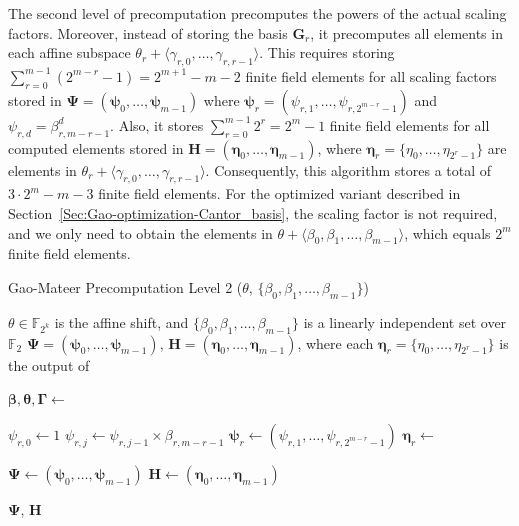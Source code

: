 The second level of precomputation precomputes the powers of the actual scaling factors. Moreover, instead of storing the basis $\mathbf{G}_r$, it precomputes all elements in each affine subspace $\theta_r + \langle \gamma_{r,0}, \ldots, \gamma_{r,r-1} \rangle$. This requires storing $\sum_{r=0}^{m-1} (2^{m-r} - 1) = 2^{m+1} - m - 2$ finite field elements for all scaling factors stored in $\boldsymbol{\Psi} = (\boldsymbol{\psi}_0, \ldots, \boldsymbol{\psi}_{m-1})$ where $\boldsymbol{\psi}_r = (\psi_{r,1}, \ldots,   \psi_{r,2^{m-r}-1})$ and $\psi_{r,d} = \beta_{r, m-r-1}^d$. 
Also, it stores $\sum_{r=0}^{m-1} 2^r = 2^m - 1$ finite field elements for all computed elements stored in $\mathbf{H} = (\boldsymbol{\eta}_0, \ldots, \boldsymbol{\eta}_{m-1})$, where $\boldsymbol{\eta}_r = \{\eta_0, \ldots, \eta_{2^r-1}\}$ are elements in $\theta_r + \langle \gamma_{r,0}, \ldots, \gamma_{r,r-1} \rangle$. Consequently, this algorithm stores a total of $3 \cdot 2^m - m - 3$ finite field elements. For the optimized variant described in Section~\ref{Sec:Gao-optimization-Cantor_basis}, the scaling factor is not required, and we only need to obtain the elements in $\theta + \langle\beta_0, \beta_1, \ldots, \beta_{m-1}\rangle$, which equals $2^m$ finite field elements.

\begin{algorithm}[htb]
	\caption{\small Gao-Mateer Precomputation Level 2 ($\theta$, $\{\beta_0, \beta_1, \ldots, \beta_{m-1}\}$)}
	\label{Algo:Gao_Precmp_lvl2}
	\begin{algorithmic}[1]
		\Require $\theta \in \mathbb{F}_{2^k}$ is the affine shift, and $\{\beta_0, \beta_1, \ldots, \beta_{m-1}\}$ is a linearly independent set over $\mathbb{F}_2$
		\Ensure $\boldsymbol{\Psi} = (\boldsymbol{\psi}_0, \ldots, \boldsymbol{\psi}_{m-1})$,  
		$\mathbf{H} = (\boldsymbol{\eta}_0, \ldots, \boldsymbol{\eta}_{m-1})$,  
		where each $\boldsymbol{\eta}_r = \{\eta_0, \ldots, \eta_{2^r-1}\}$ is the output of 
		
		\State $\boldsymbol{\beta}, \boldsymbol{\theta}, \boldsymbol{\Gamma} \gets$ 
		
		\State $\psi_{r,0} \gets 1$ 
		\State $\psi_{r,j} \gets \psi_{r,j - 1} \times \beta_{r, m - r - 1}$
		\EndFor
		\State $\boldsymbol{\psi}_r \gets (\psi_{r,1}, \ldots, \psi_{r,2^{m - r} - 1})$ 
		\State $\boldsymbol{\eta}_r \gets$ 
		\EndFor
		
		\State $\boldsymbol{\Psi} \gets (\boldsymbol{\psi}_0, \ldots, \boldsymbol{\psi}_{m - 1})$
		\State $\mathbf{H} \gets (\boldsymbol{\eta}_0, \ldots, \boldsymbol{\eta}_{m - 1})$
		
		\State \Return $\boldsymbol{\Psi}$, $\mathbf{H}$
	\end{algorithmic}
\end{algorithm}


